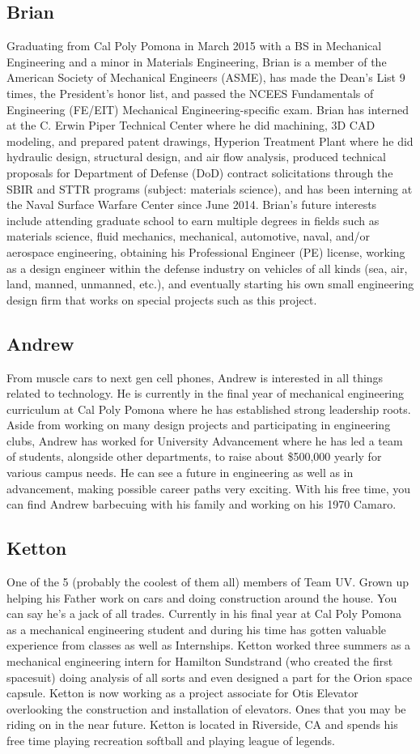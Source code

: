 \documentclass{report}
\begin{document}
\subsection{Brian}
Graduating from Cal Poly Pomona in March 2015 with a BS in Mechanical Engineering and a minor in Materials Engineering, Brian is a member of the American Society of Mechanical Engineers (ASME), has made the Dean’s List 9 times, the President’s honor list, and passed the NCEES Fundamentals of Engineering (FE/EIT) Mechanical Engineering-specific exam.  Brian has interned at the C. Erwin Piper Technical Center where he did machining, 3D CAD modeling, and prepared patent drawings, Hyperion Treatment Plant where he did hydraulic design, structural design, and air flow analysis, produced technical proposals for Department of Defense (DoD) contract solicitations through the SBIR and STTR programs (subject: materials science), and has been interning at the Naval Surface Warfare Center since June 2014.  Brian’s future interests include attending graduate school to earn multiple degrees in fields such as materials science, fluid mechanics, mechanical, automotive, naval, and/or aerospace engineering, obtaining his Professional Engineer (PE) license, working as a design engineer within the defense industry on vehicles of all kinds (sea, air, land, manned, unmanned, etc.), and eventually starting his own small engineering design firm that works on special projects such as this project.
\subsection{Andrew}
From muscle cars to next gen cell phones, Andrew is interested in all things related to technology.  He is currently in the final year of mechanical engineering curriculum at Cal Poly Pomona where he has established strong leadership roots.  Aside from working on many design projects and participating in engineering clubs, Andrew has worked for University Advancement where he has led a team of students, alongside other departments, to raise about \$500,000 yearly for various campus needs.  He can see a future in engineering as well as in advancement, making possible career paths very exciting.  With his free time, you can find Andrew barbecuing with his family and working on his 1970 Camaro.
\subsection{Ketton}
One of the 5 (probably the coolest of them all) members of Team UV.  Grown up helping his Father work on cars and doing construction around the house.  You can say he’s  a jack of all trades.  Currently in his final year at Cal Poly Pomona as a mechanical engineering student and during his time has gotten valuable experience from classes as well as Internships.  Ketton worked three summers as a mechanical engineering intern for Hamilton Sundstrand (who created the first spacesuit) doing analysis of all sorts and even designed a part for the Orion space capsule.  Ketton is now working as a project associate for Otis Elevator overlooking the construction and installation of elevators.  Ones that you may be riding on in the near future.  Ketton is located in Riverside, CA and spends his free time playing recreation softball and playing league of legends.
\end{document}
